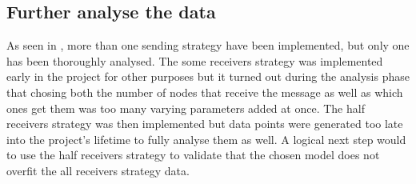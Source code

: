 \subsection{Further analyse the data}
As seen in , more than one sending strategy have been
implemented, but only one has been thoroughly analysed. The some receivers
strategy was implemented early in the project for other purposes but it turned
out during the analysis phase that chosing both the number of nodes that receive
the message as well as which ones get them was too many varying parameters
added at once. The half receivers strategy was then implemented but data points
were generated too late into the project's lifetime to fully analyse them as
well. A logical next step would to use the half receivers strategy to validate
that the chosen model does not overfit the all receivers strategy data.
